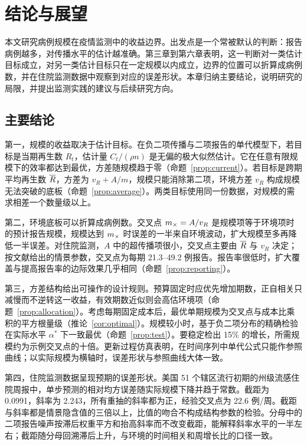 \chapter{结论与展望}
\label{chap:conclusion}

本文研究病例规模在疫情监测中的收益边界。出发点是一个常被默认的判断：报告病例越多，对传播水平的估计越准确。第三章到第六章表明，这一判断对一类估计目标成立，对另一类估计目标只在一定规模以内成立，边界的位置可以折算成病例数，并在住院监测数据中观察到对应的误差形状。本章归纳主要结论，说明研究的局限，并提出监测实践的建议与后续研究方向。

\section{主要结论}
\label{sec:concl-main}

第一，规模的收益取决于估计目标。在负二项传播与二项报告的单代模型下，若目标是当期再生数 $R_t$，估计量 $C_t/(\rho n)$ 是无偏的极大似然估计。它在任意有限规模下的效率都达到最优，方差随规模趋于零（命题~\ref{prop:current}）。若目标是跨期平均再生数 $\overline{R}$，方差为 $v_R+A/m$，规模只能消除第二项，环境方差 $v_R$ 构成规模无法突破的底板（命题~\ref{prop:average}）。两类目标使用同一份数据，对规模的需求相差一个数量级以上。

第二，环境底板可以折算成病例数。交叉点 $m_{\times}=A/v_R$ 是规模项等于环境项时的预计报告规模，规模达到 $m_{\times}$ 时误差的一半来自环境波动，扩大规模至多再降低一半误差。对住院监测，$A$ 中的超传播项很小，交叉点主要由 $\overline{R}$ 与 $v_R$ 决定；按文献给出的情景参数，交叉点为每期 21.3--49.2 例报告。报告率很低时，扩大覆盖与提高报告率的边际效果几乎相同（命题~\ref{prop:reporting}）。

第三，方差结构给出可操作的设计规则。预算固定时应优先增加期数，正自相关只减慢而不逆转这一收益，有效期数近似则会高估环境项（命题~\ref{prop:allocation}）。考虑每期固定成本后，最优单期规模为交叉点与成本比乘积的平方根量级（推论~\ref{cor:optimal}）。规模较小时，基于负二项分布的精确检验在实际水平 $\alpha^*$ 下一致最优（命题~\ref{prop:test}）。要稳定检出 15\% 的增长，所需规模约为示例交叉点的十倍。更新过程仿真表明，在时间序列中单代公式只能作参照曲线；以实际规模为横轴时，误差形状与参照曲线大体一致。

第四，住院监测数据呈现预期的误差形状。美国 51 个辖区流行初期的州级流感住院周报中，单步预测的相对均方误差随实际规模下降并趋于常数。截距为 0.0991，斜率为 2.243，所有重抽的斜率都为正，经验交叉点为 22.6 例/周。截距与斜率都是情景隐含值的三倍以上，比值的吻合不构成结构参数的检验。分母中的二项报告噪声按滞后权重平方和抬高斜率而不改变截距，能解释斜率水平的一半左右；截距随分母回溯滞后上升，与环境的时间相关和周增长比的口径一致。

